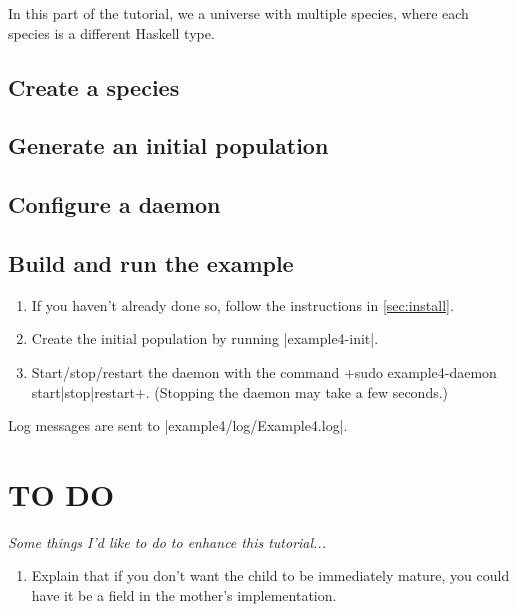 \documentclass[a4paper,10pt]{report}
\begin{document}
\begin{itemize}
In this part of the tutorial, we a universe with multiple species,
where each species is a different Haskell type.

\section{Create a species}
\label{sec:species4}






\section{Generate an initial population}
\label{sec:pop4}



\section{Configure a daemon}
\label{sec:daemon4}



\section{Build and run the example}
\label{sec:run4}

\begin{enumerate}
\item If you haven't already done so, follow the instructions in 
\ref{sec:install}.
\item Create the initial population by running |example4-init|.
\item Start/stop/restart the daemon with the command
\UndefineShortVerb{\|}
\DefineShortVerb{\+}
+sudo example4-daemon start|stop|restart+.
\UndefineShortVerb{\+}
\DefineShortVerb{\|}
(Stopping the daemon may take a few seconds.)
\end{enumerate}

Log messages are sent to |example4/log/Example4.log|.

\chapter{TO DO}
\textit{Some things I'd like to do to enhance this tutorial...}

\begin{enumerate}
\item Explain that if you don't want the child to be immediately mature,
you could have it be a field in the mother's implementation.


\end{enumerate}
\end{itemize}
\end{document}

